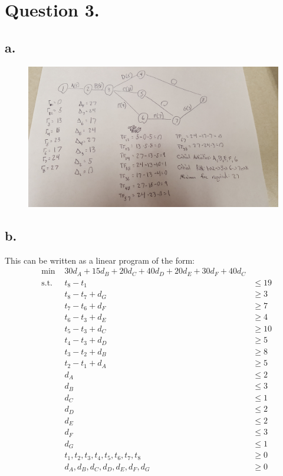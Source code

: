 \documentclass[10pt, letterpaper]{paper}
\begin{document}
\section*{Question 3.}

\subsection*{a.}

\begin{figure}[H]
\centering
\includegraphics[width=1.0\textwidth]{ProjectNodes.jpeg}
\end{figure}


\subsection*{b.}
This can be written as a linear program of the form:
\begin{equation*}
\begin{alignedat}{3}
&\text{min }&30d_A + 15d_B + 20d_C + 40d_D + 20d_E + 30d_F + 40d_C&\\
&\text{s.t. } &t_8 - t_1  &\leq 19\\
& &t_8 - t_7 + d_G &\geq 3\\
& &t_7 - t_6 + d_F &\geq 7\\
& &t_6 - t_3 + d_E &\geq 4\\
& &t_5 - t_3 + d_C &\geq 10\\
& &t_4 - t_3 + d_D &\geq 5\\
& &t_3 - t_2 + d_B &\geq 8\\
& &t_2 - t_1 + d_A &\geq 5\\
& &d_A &\leq 2\\
& &d_B &\leq 3\\
& &d_C &\leq 1\\
& &d_D &\leq 2\\
& &d_E &\leq 2\\
& &d_F &\leq 3\\
& &d_G &\leq 1\\
& &t_1,t_2,t_3,t_4,t_5,t_6,t_7,t_8 &\geq 0\\
& &d_A,d_B,d_C,d_D,d_E,d_F,d_G &\geq 0\\
\end{alignedat}
\end{equation*}
\end{document}
